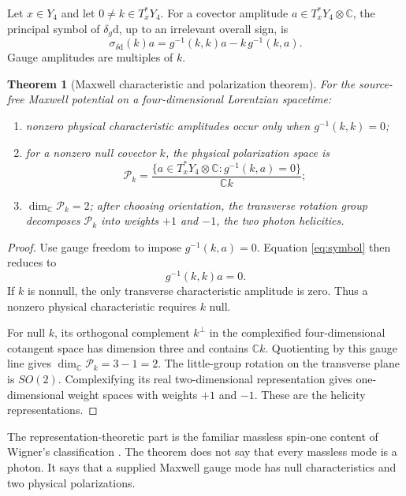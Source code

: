 \documentclass[11pt,a4paper]{article}
\numberwithin{equation}{section}
\newtheorem{theorem}{Theorem}[section]
\theoremstyle{definition}
\theoremstyle{remark}
\newcommand{\dd}{\mathrm{d}}
\newcommand{\cP}{\mathcal P}
\newcommand{\bbC}{\mathbb C}
\begin{document}
Let \(x\in Y_4\) and let \(0\ne k\in T_x^*Y_4\).  For a covector amplitude
\(a\in T_x^*Y_4\otimes\bbC\), the principal symbol of
\(\delta_g\dd\), up to an irrelevant overall sign, is
\begin{equation}
\sigma_{\delta\dd}(k)a
=g^{-1}(k,k)a-k\,g^{-1}(k,a).
\label{eq:symbol}
\end{equation}
Gauge amplitudes are multiples of \(k\).

\begin{theorem}[Maxwell characteristic and polarization theorem]
\label{thm:maxwell-characteristic}
For the source-free Maxwell potential on a four-dimensional Lorentzian
spacetime:
\begin{enumerate}[label=(\alph*)]
\item nonzero physical characteristic amplitudes occur only when
\(g^{-1}(k,k)=0\);
\item for a nonzero null covector \(k\), the physical polarization space
is
\[
\cP_k=
\frac{\{a\in T_x^*Y_4\otimes\bbC:
g^{-1}(k,a)=0\}}{\bbC k};
\label{eq:polarization}
\]
\item \(\dim_{\bbC}\cP_k=2\); after choosing orientation, the transverse
rotation group decomposes \(\cP_k\) into weights \(+1\) and \(-1\), the
two photon helicities.
\end{enumerate}
\end{theorem}

\begin{proof}
Use gauge freedom to impose \(g^{-1}(k,a)=0\).  Equation
\eqref{eq:symbol} then reduces to
\[
g^{-1}(k,k)a=0.
\]
If \(k\) is nonnull, the only transverse characteristic amplitude is
zero.  Thus a nonzero physical characteristic requires \(k\) null.

For null \(k\), its orthogonal complement \(k^\perp\) in the complexified
four-dimensional cotangent space has dimension three and contains
\(\bbC k\).  Quotienting by this gauge line gives
\(\dim_\bbC\cP_k=3-1=2\).  The little-group rotation on the transverse
plane is \(SO(2)\).  Complexifying its real two-dimensional
representation gives one-dimensional weight spaces with weights \(+1\)
and \(-1\).  These are the helicity representations.
\end{proof}

The representation-theoretic part is the familiar massless spin-one
content of Wigner's classification \cite{Wigner1939}.  The theorem does
not say that every massless mode is a photon.  It says that a supplied
Maxwell gauge mode has null characteristics and two physical
polarizations.
\end{document}
